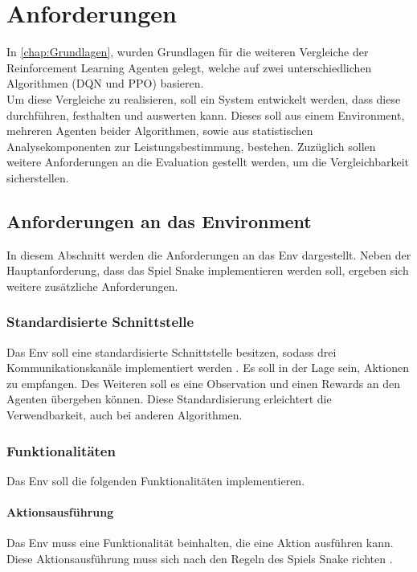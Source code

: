 \chapter{Anforderungen} \label{chap:Anforderungen}
In \autoref{chap:Grundlagen}, wurden Grundlagen für die weiteren Vergleiche der Reinforcement Learning Agenten gelegt, welche auf zwei unterschiedlichen Algorithmen (DQN und PPO) basieren.\\
Um diese Vergleiche zu realisieren, soll ein System entwickelt werden, dass diese durchführen, festhalten und auswerten kann. Dieses soll aus einem Environment, mehreren Agenten beider Algorithmen, sowie aus statistischen Analysekomponenten zur Leistungsbestimmung, bestehen. Zuzüglich sollen weitere Anforderungen an die Evaluation gestellt werden, um die Vergleichbarkeit sicherstellen.

\section{Anforderungen an das Environment} \label{sec:Anforderungen_Env}
In diesem Abschnitt werden die Anforderungen an das Env dargestellt. Neben der Hauptanforderung, dass das Spiel Snake implementieren werden soll, ergeben sich weitere zusätzliche Anforderungen.

\subsection{Standardisierte Schnittstelle} \label{subsec:Anforderungen_Schnittstelle}
Das Env soll eine standardisierte Schnittstelle besitzen, sodass drei Kommunikationskanäle implementiert werden . Es soll in der Lage sein, Aktionen zu empfangen. Des Weiteren soll es eine Observation und einen Rewards an den Agenten übergeben können. Diese Standardisierung erleichtert die Verwendbarkeit, auch bei anderen Algorithmen.

\subsection{Funktionalitäten} \label{subsec:Anforderungen_Funktionalität_Env}
Das Env soll die folgenden Funktionalitäten implementieren.

\subsubsection{Aktionsausführung} \label{subsubsec:Anforderungen_Aktionsausführung}
Das Env muss eine Funktionalität beinhalten, die eine Aktion ausführen kann. Diese Aktionsausführung muss sich nach den Regeln des Spiels Snake richten .

